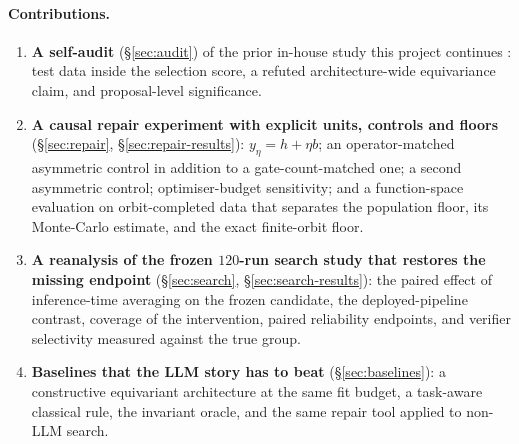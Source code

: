 \documentclass[11pt]{article}
\begin{document}
\paragraph{Contributions.}
\begin{enumerate}[leftmargin=1.4em,itemsep=2pt,topsep=2pt]
  \item \textbf{A self-audit} (\S\ref{sec:audit}) of the prior in-house study this project
  continues \cite{ho2026prior}: test data inside the selection score, a refuted
  architecture-wide equivariance claim, and proposal-level significance.
  \item \textbf{A causal repair experiment with explicit units, controls and floors}
  (\S\ref{sec:repair}, \S\ref{sec:repair-results}): $y_\eta=h+\eta b$; an
  operator-matched asymmetric control in addition to a gate-count-matched one; a
  second asymmetric control; optimiser-budget sensitivity; and a function-space
  evaluation on orbit-completed data that separates the population floor, its Monte-Carlo
  estimate, and the exact finite-orbit floor.
  \item \textbf{A reanalysis of the frozen $120$-run search study that restores the
  missing endpoint} (\S\ref{sec:search}, \S\ref{sec:search-results}): the paired effect of
  inference-time averaging on the frozen candidate, the deployed-pipeline contrast,
  coverage of the intervention, paired reliability endpoints, and verifier selectivity
  measured against the true group.
  \item \textbf{Baselines that the LLM story has to beat} (\S\ref{sec:baselines}): a
  constructive equivariant architecture at the same fit budget, a task-aware classical
  rule, the invariant oracle, and the same repair tool applied to non-LLM search.
\end{enumerate}
\end{document}
